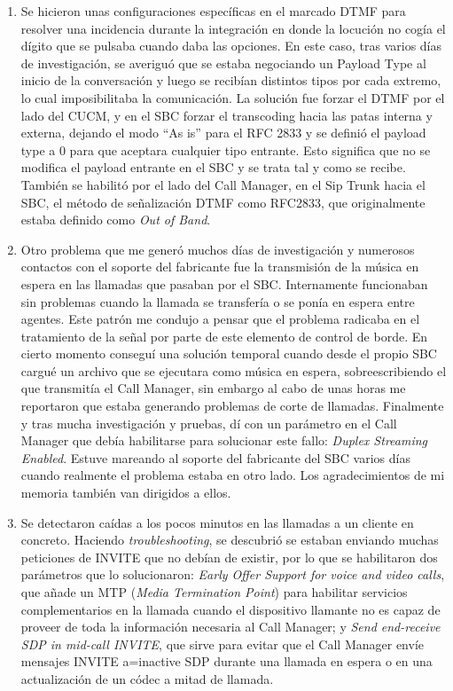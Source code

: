\documentclass[a4paper, 12pt]{book}
\begin{document}
\begin{enumerate}
  \item Se hicieron unas configuraciones específicas en el marcado DTMF para resolver una incidencia durante la integración en donde la locución no cogía el dígito que se pulsaba cuando daba las opciones. En este caso, tras varios días de investigación, se averiguó que se estaba negociando un Payload Type al inicio de la conversación y luego se recibían distintos tipos por cada extremo, lo cual imposibilitaba la comunicación. La solución fue forzar el DTMF por el lado del CUCM, y en el SBC forzar el transcoding hacia las patas interna y externa, dejando el modo “As is” para el RFC 2833 y se definió el payload type a 0 para que aceptara cualquier tipo entrante. Esto significa que no se modifica el payload entrante en el SBC y se trata tal y como se recibe.
  También se habilitó por el lado del Call Manager, en el Sip Trunk hacia el SBC, el método de señalización DTMF como RFC2833, que originalmente estaba definido como \emph{Out of Band}.
  \item Otro problema que me generó muchos días de investigación y numerosos contactos con el soporte del fabricante fue la transmisión de la música en espera en las llamadas que pasaban por el SBC. Internamente funcionaban sin problemas cuando la llamada se transfería o se ponía en espera entre agentes. Este patrón me condujo a pensar que el problema radicaba en el tratamiento de la señal por parte de este elemento de control de borde. En cierto momento conseguí una solución temporal cuando desde el propio SBC cargué un archivo que se ejecutara como música en espera, sobreescribiendo el que transmitía el Call Manager, sin embargo al cabo de unas horas me reportaron que estaba generando problemas de corte de llamadas. Finalmente y tras mucha investigación y pruebas, dí con un parámetro en el Call Manager que debía habilitarse para solucionar este fallo: \emph{Duplex Streaming Enabled}. Estuve mareando al soporte del fabricante del SBC varios días cuando realmente el problema estaba en otro lado. Los agradecimientos de mi memoria también van dirigidos a ellos.
  \item Se detectaron caídas a los pocos minutos en las llamadas a un cliente en concreto. Haciendo \emph{troubleshooting}, se descubrió se estaban enviando muchas peticiones de INVITE que no debían de existir, por lo que se habilitaron dos parámetros que lo solucionaron: \emph{Early Offer Support for voice and video calls}, que añade un MTP (\emph{Media Termination Point}) para habilitar servicios complementarios en la llamada cuando el dispositivo llamante no es capaz de proveer de toda la información necesaria al Call Manager; y \emph{Send end-receive SDP in mid-call INVITE}, que sirve para evitar que el Call Manager envíe mensajes INVITE a=inactive SDP durante una llamada en espera o en una actualización de un códec a mitad de llamada.
\end{enumerate}
\end{document}
